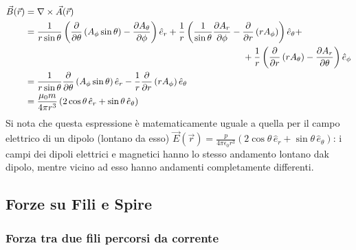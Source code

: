 \begin{equation}
	\begin{split}
		\vec{B}(\vec{r}) &= \nabla\times\vec{A}(\vec{r}) \\
				 &= \displaystyle\frac{1}{r\sin\theta} \left( \displaystyle\frac{\partial}{\partial\theta} \left( A_{\phi} \sin\theta \right) - \displaystyle\frac{\partial A_{\theta}}{\partial\phi} \right) \hat{e}_r + \displaystyle\frac{1}{r} \left( \displaystyle\frac{1}{\sin\theta} \displaystyle\frac{\partial A_r}{\partial\phi} - \displaystyle\frac{\partial}{\partial r} \left(r A_{\phi} \right)\right) \hat{e}_{\theta} + \\ 
				 & \qquad\qquad\qquad\qquad\qquad\qquad\qquad\qquad\qquad\qquad\qquad\qquad + \displaystyle\frac{1}{r} \left(\displaystyle\frac{\partial}{\partial r} \left( r A_{\theta} \right) - \displaystyle\frac{\partial A_r}{\partial\theta} \right) \hat{e}_{\phi} \\ 
				 &= \displaystyle\frac{1}{r\sin\theta}\displaystyle\frac{\partial}{\partial\theta} \left(A_{\phi} \sin\theta\right) \hat{e}_r - \displaystyle\frac{1}{r} \displaystyle\frac{\partial}{\partial r} \left( r A_{\phi} \right) \hat{e}_{\theta} \\ 
				 &= \displaystyle\frac{\mu_0 m}{4\pi r^3} \left(2\cos\theta \,\hat{e}_r + \sin\theta \,\hat{e}_{\theta}\right)
	\end{split}
	\label{eq:}
\end{equation}
Si nota che questa espressione è matematicamente uguale a quella per il campo elettrico di un dipolo (lontano da esso) $ \vec{E}(\vec{r}) = \frac{p}{4\pi\epsilon_0 r^3} \left(2\cos\theta \,\hat{e}_r + \sin\theta \,\hat{e}_{\theta} \right) $: i campi dei dipoli elettrici e magnetici hanno lo stesso andamento lontano dak dipolo, mentre vicino ad esso hanno andamenti completamente differenti.

\subsection{Forze su Fili e Spire}

\subsubsection{Forza tra due fili percorsi da corrente}

